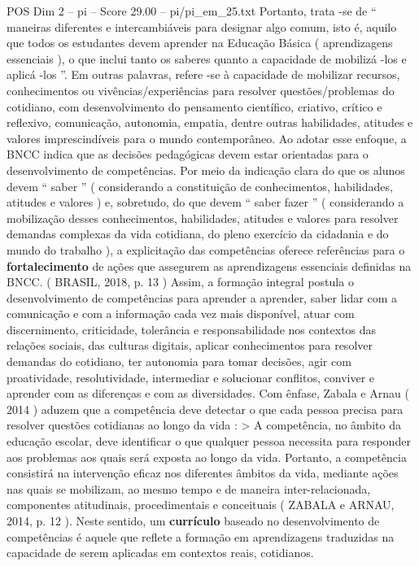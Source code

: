 \begin{textsample}{POS Dim 2 – pi – Score 29.00 – pi/pi\_em\_25.txt}
Portanto, trata -se de “ maneiras diferentes e intercambiáveis para designar algo comum, isto é, aquilo que todos os estudantes devem aprender na Educação Básica ( aprendizagens essenciais ), o que inclui tanto os saberes quanto a capacidade de mobilizá -los e aplicá -los ”.
Em outras palavras, refere -se à capacidade de mobilizar recursos, conhecimentos ou vivências/experiências para resolver questões/problemas do cotidiano, com desenvolvimento do pensamento científico, criativo, crítico e reflexivo, comunicação, autonomia, empatia, dentre outras habilidades, atitudes e valores imprescindíveis para o mundo contemporâneo.
Ao adotar esse enfoque, a BNCC indica que as decisões pedagógicas devem estar orientadas para o desenvolvimento de competências.
Por meio da indicação clara do que os alunos devem “ saber ” ( considerando a constituição de conhecimentos, habilidades, atitudes e valores ) e, sobretudo, do que devem “ saber fazer ” ( considerando a mobilização desses conhecimentos, habilidades, atitudes e valores para resolver demandas complexas da vida cotidiana, do pleno exercício da cidadania e do mundo do trabalho ), a explicitação das competências oferece referências para o \textbf{fortalecimento} de ações que assegurem as aprendizagens essenciais definidas na BNCC. ( BRASIL, 2018, p. 13 ) Assim, a formação integral postula o desenvolvimento de competências para aprender a aprender, saber lidar com a comunicação e com a informação cada vez mais disponível, atuar com discernimento, criticidade, tolerância e responsabilidade nos contextos das relações sociais, das culturas digitais, aplicar conhecimentos para resolver demandas do cotidiano, ter autonomia para tomar decisões, agir com proatividade, resolutividade, intermediar e solucionar conflitos, conviver e aprender com as diferenças e com as diversidades.
Com ênfase, Zabala e Arnau ( 2014 ) aduzem que a competência deve detectar o que cada pessoa precisa para resolver questões cotidianas ao longo da vida : > A competência, no âmbito da educação escolar, deve identificar o que qualquer pessoa necessita para responder aos problemas aos quais será exposta ao longo da vida.
Portanto, a competência consistirá na intervenção eficaz nos diferentes âmbitos da vida, mediante ações nas quais se mobilizam, ao mesmo tempo e de maneira inter-relacionada, componentes atitudinais, procedimentais e conceituais ( ZABALA e ARNAU, 2014, p. 12 ).
Neste sentido, um \textbf{currículo} baseado no desenvolvimento de competências é aquele que reflete a formação em aprendizagens traduzidas na capacidade de serem aplicadas em contextos reais, cotidianos.

\end{textsample}
